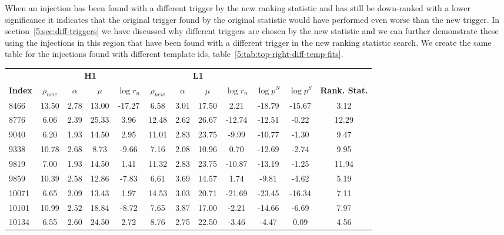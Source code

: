 When an injection has been found with a different trigger by the new ranking statistic and has still be down-ranked with a lower significance it indicates that the original trigger found by the original statistic would have performed even worse than the new trigger. In section~\ref{5:sec:diff-triggers} we have discussed why different triggers are chosen by the new statistic and we can further demonstrate these using the injections in this region that have been found with a different trigger in the new ranking statistic search. We create the same table for the injections found with different template ids, table~\ref{5:tab:top-right-diff-temp-fits}.
%
\begin{table}[ht]
    \centering
    \small
    \setlength{\tabcolsep}{4pt}
    \begin{tabular}{lccccccccccc}
        \toprule
        & \multicolumn{4}{c}{\textbf{H1}} & \multicolumn{4}{c}{\textbf{L1}} \\
        \cmidrule(lr){2-5} \cmidrule(lr){6-9}
        \textbf{Index} & \textbf{$\rho_{new}$} & \textbf{$\alpha$} & \textbf{$\mu$} & \textbf{$\log r_n$} & \textbf{$\rho_{new}$} & \textbf{$\alpha$} & \textbf{$\mu$} & \textbf{$\log r_n$} & \textbf{$\log p^{N}$} & \textbf{$\log p^{S}$} & \textbf{Rank. Stat.} \\
        \midrule
        8466 & 13.50 & 2.78 & 13.00 & -17.27 & 6.58 & 3.01 & 17.50 & 2.21 & -18.79 & -15.67 & 3.12 \\
        8776 & 6.06 & 2.39 & 25.33 & 3.96 & 12.48 & 2.62 & 26.67 & -12.74 & -12.51 & -0.22 & 12.29 \\
        9040 & 6.20 & 1.93 & 14.50 & 2.95 & 11.01 & 2.83 & 23.75 & -9.99 & -10.77 & -1.30 & 9.47 \\
        9338 & 10.78 & 2.68 & 8.73 & -9.66 & 7.16 & 2.08 & 10.96 & 0.70 & -12.69 & -2.74 & 9.95 \\
        9819 & 7.00 & 1.93 & 14.50 & 1.41 & 11.32 & 2.83 & 23.75 & -10.87 & -13.19 & -1.25 & 11.94 \\
        9859 & 10.39 & 2.58 & 12.86 & -7.83 & 6.61 & 3.69 & 14.57 & 1.74 & -9.81 & -4.62 & 5.19 \\
        10071 & 6.65 & 2.09 & 13.43 & 1.97 & 14.53 & 3.03 & 20.71 & -21.69 & -23.45 & -16.34 & 7.11 \\
        10101 & 10.99 & 2.52 & 18.84 & -8.72 & 7.65 & 3.87 & 17.00 & -2.21 & -14.66 & -6.69 & 7.97 \\
        10134 & 6.55 & 2.60 & 24.50 & 2.72 & 8.76 & 2.75 & 22.50 & -3.46 & -4.47 & 0.09 & 4.56 \\

\end{tabular}
\end{table}
